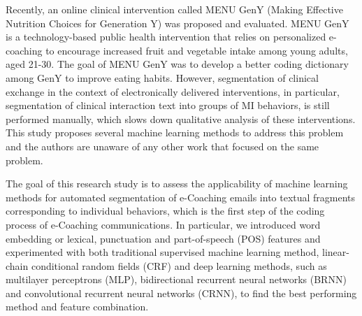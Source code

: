 \documentclass{amia}
\begin{document}
Recently, an online clinical intervention called MENU GenY (Making Effective Nutrition Choices for Generation Y) was proposed and evaluated. \cite{alexander2017motivations} MENU GenY is a technology-based public health intervention that relies on personalized e-coaching to encourage increased fruit and vegetable intake among young adults, aged 21-30. The goal of MENU GenY was to develop a better coding dictionary among GenY to improve eating habits. However, segmentation of clinical exchange in the context of electronically delivered interventions, in particular, segmentation of clinical interaction text into groups of MI behaviors, is still performed manually, which slows down qualitative analysis of these interventions. This study proposes several machine learning methods to address this problem and the authors are unaware of any other work that focused on the same problem.

The goal of this research study is to assess the applicability of machine learning methods for automated segmentation of e-Coaching emails into textual fragments corresponding to individual behaviors, which is the first step of the coding process of e-Coaching communications. In particular, we introduced word embedding or lexical, punctuation and  part-of-speech (POS) features and experimented with both traditional supervised machine learning method, linear-chain conditional random fields (CRF)\cite{lafferty2001conditional} and deep learning methods, such as multilayer perceptrons (MLP),\cite{rumelhart1986learning} bidirectional recurrent neural networks (BRNN)\cite{schuster1997bidirectional} and convolutional recurrent neural networks (CRNN),\cite{treviso2017sentence} to find the best performing method and feature combination. 
\end{document}
